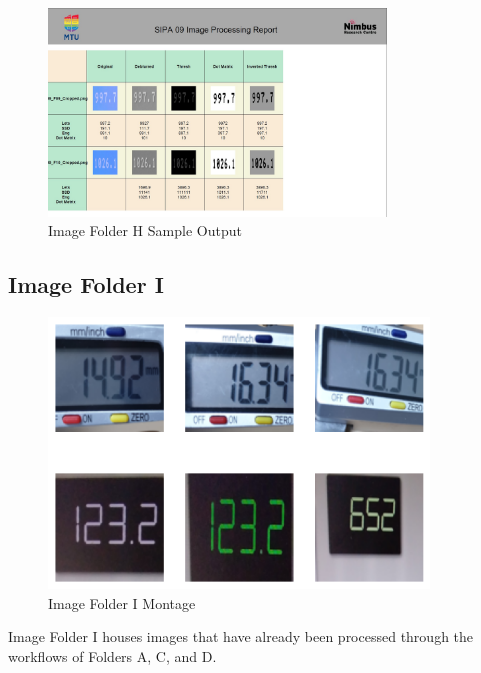 \begin{figure}[ht]
    \centering
    \includegraphics[width=0.8\textwidth]{Figures/Methodology/sipa_09/sample_output.jpg}
    \caption[Image Folder H Sample Output]{Image Folder H Sample Output}
    \label{fig:Image Folder H Sample Output}
\end{figure}



\newpage

\subsection{Image Folder I}

\begin{figure}[ht]
    \centering
    \includegraphics[width=0.9\textwidth]{Figures/EDA_Charts/10/montage.png}
    \caption[Image Folder I Montage]{Image Folder I Montage}
    \label{fig:Image Folder I Montage}
\end{figure}

Image Folder I houses images that have already been processed through the workflows of Folders A, C, and D.


